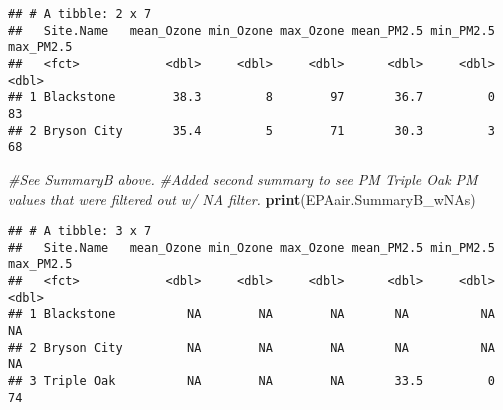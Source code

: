 \documentclass[]{article}
\newenvironment{Shaded}{\begin{snugshade}}{\end{snugshade}}
\newcommand{\KeywordTok}[1]{\textcolor[rgb]{0.13,0.29,0.53}{\textbf{#1}}}
\newcommand{\CommentTok}[1]{\textcolor[rgb]{0.56,0.35,0.01}{\textit{#1}}}
\newcommand{\NormalTok}[1]{#1}
\begin{document}
\begin{verbatim}
## # A tibble: 2 x 7
##   Site.Name   mean_Ozone min_Ozone max_Ozone mean_PM2.5 min_PM2.5 max_PM2.5
##   <fct>            <dbl>     <dbl>     <dbl>      <dbl>     <dbl>     <dbl>
## 1 Blackstone        38.3         8        97       36.7         0        83
## 2 Bryson City       35.4         5        71       30.3         3        68
\end{verbatim}

\begin{Shaded}
\begin{Highlighting}[]
\CommentTok{#See SummaryB above. }
\CommentTok{#Added second summary to see PM Triple Oak PM values that were filtered out w/ NA filter. }
\KeywordTok{print}\NormalTok{(EPAair.SummaryB_wNAs)}
\end{Highlighting}
\end{Shaded}

\begin{verbatim}
## # A tibble: 3 x 7
##   Site.Name   mean_Ozone min_Ozone max_Ozone mean_PM2.5 min_PM2.5 max_PM2.5
##   <fct>            <dbl>     <dbl>     <dbl>      <dbl>     <dbl>     <dbl>
## 1 Blackstone          NA        NA        NA       NA          NA        NA
## 2 Bryson City         NA        NA        NA       NA          NA        NA
## 3 Triple Oak          NA        NA        NA       33.5         0        74
\end{verbatim}
\end{document}
